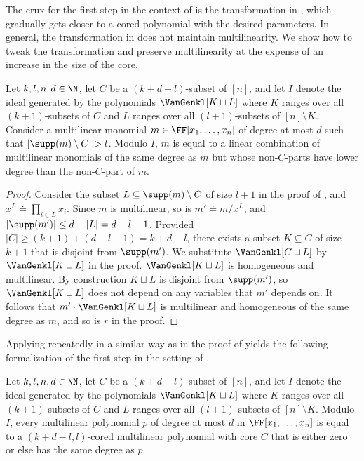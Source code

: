 The crux for the first step in the context of  is the transformation in , which gradually gets closer to a cored polynomial with the desired parameters. In general, the transformation in  does not maintain multilinearity. We show how to tweak the transformation and preserve multilinearity at the expense of an increase in the size of the core.

\begin{proposition}
\label{prop.membership-coredform}
Let \(k,l,n,d \in\N\), let \(C\) be a \((k+d-l)\)-subset of \([n]\), and let $I$ denote the ideal generated by the polynomials $\VanGenkl[K \sqcup L]$ where $K$ ranges over all $(k+1)$-subsets of $C$ and $L$ ranges over all $(l+1)$-subsets of $[n] \setminus K$. Consider a multilinear monomial $m \in \FF[x_1,\dots,x_n]$ of degree at most $d$ such that $|\supp(m) \setminus C| > l$. Modulo $I$, $m$ is equal to a linear combination of multilinear monomials of the same degree as $m$ but whose non-$C$-parts have lower degree than the non-$C$-part of $m$.
\end{proposition}
\begin{proof}
Consider the subset $L \subseteq \supp(m) \setminus C$ of size $l+1$ in the proof of , and $x^L \doteq \prod_{i \in L} x_i$. Since $m$ is multilinear, so is $m' \doteq m/x^L$, and $|\supp(m')| \le d-|L| = d-l-1$. Provided $|C| \ge (k+1) + (d-l-1) = k+d-l$, there exists a subset $K \subseteq C$ of size $k+1$ that is disjoint from $\supp(m')$. We substitute $\VanGenkl[C \sqcup L]$ by $\VanGenkl[K \sqcup L]$ in the proof. $\VanGenkl[K \sqcup L]$ is homogeneous and multilinear. By construction $K \sqcup L$ is disjoint from $\supp(m')$, so $\VanGenkl[K \sqcup L]$ does not depend on any variables that $m'$ depends on. It follows that $m' \cdot \VanGenkl[K \sqcup L]$ is multilinear and homogeneous of the same degree as $m$, and so is $r$ in the proof.
\end{proof}

Applying  repeatedly in a similar way as  in the proof of  yields the following formalization of the first step in the setting of .
\begin{lemma}
  \label{lem.membership-coredform}
  Let \(k,l,n,d \in\N\), let \(C\) be a \((k+d-l)\)-subset of \([n]\), and let $I$ denote the ideal generated by the polynomials $\VanGenkl[K \sqcup L]$ where $K$ ranges over all $(k+1)$-subsets of $C$ and $L$ ranges over all $(l+1)$-subsets of $[n] \setminus K$.
  Modulo $I$,
  every multilinear polynomial $p $ of degree at most $d$ in $\FF[x_1,\dots,x_n]$ is equal to a \((k+d-l,l)\)-cored multilinear polynomial with core \(C\) that is either zero or else has the same degree as $p$.
\end{lemma}

